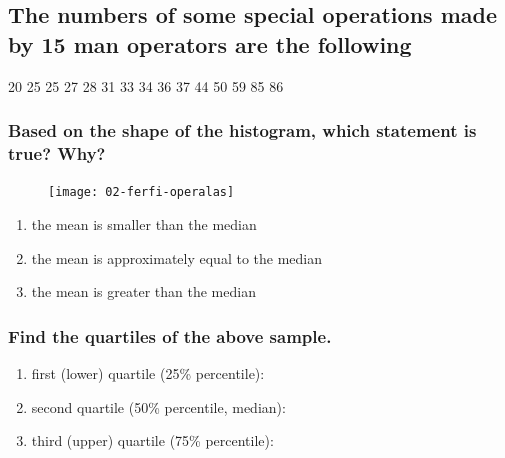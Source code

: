 
\subsection{The numbers of some special operations made by 15 man operators are the following}


	\begin{center}
		20  25  25  27  28  31  33  34  36  37  44  50  59  85  86
	\end{center}	

	  
	
	\subsubsection*{Based on the shape of the histogram, which statement is true? Why?}
	\begin{figure} \vspace{-100pt}
	  \begin{flushright}
	  	\texttt{[image: 02-ferfi-operalas]}
	  	\vspace{-140pt}
	  \end{flushright}
	\end{figure}	
	\begin{enumerate}
	\item the mean is smaller than the median
	\item the mean is approximately equal to the median
	\item the mean is greater than the median
	\end{enumerate}

	\subsubsection*{Find the quartiles of the above sample.}
	\begin{enumerate}
	\item first (lower) quartile (25\% percentile):
	\item second quartile (50\% percentile, median):
	\item third (upper) quartile (75\% percentile):
	\end{enumerate}

